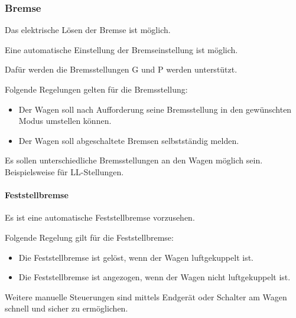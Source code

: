 \subsubsection{Bremse}
\begin{feat}
Das elektrische Lösen der Bremse ist möglich.
\end{feat}
\begin{feat}
Eine automatische Einstellung der Bremseinstellung ist möglich.
\end{feat}
\begin{rem} [zu Anf. 17]
Dafür werden die Bremsstellungen G und P werden unterstützt.
\end{rem}
\begin{rem} [zu Anf. 17]
Folgende Regelungen gelten für die Bremsstellung:
\begin{itemize}
    \item Der Wagen soll nach Aufforderung seine Bremsstellung in den gewünschten Modus umstellen können.
    \item Der Wagen soll abgeschaltete Bremsen selbstständig melden.
\end{itemize}
\end{rem}
\begin{rem} [zu Anf. 17]
Es sollen unterschiedliche Bremsstellungen an den Wagen möglich sein.\\
Beispielsweise für LL-Stellungen.
\end{rem}

\paragraph{Feststellbremse}
\begin{feat}
Es ist eine automatische Feststellbremse vorzusehen.
\end{feat}
\begin{rem} [zu Anf. 18]
Folgende Regelung gilt für die Feststellbremse:
\begin{itemize}
    \item Die Feststellbremse ist gelöst, wenn der Wagen luftgekuppelt ist.
    \item Die Feststellbremse ist angezogen, wenn der Wagen nicht luftgekuppelt ist.
\end{itemize}
\end{rem}
\begin{rem} [zu Anf. 18]
Weitere manuelle Steuerungen sind mittels Endgerät oder Schalter am Wagen schnell und sicher zu ermöglichen.
\end{rem}

